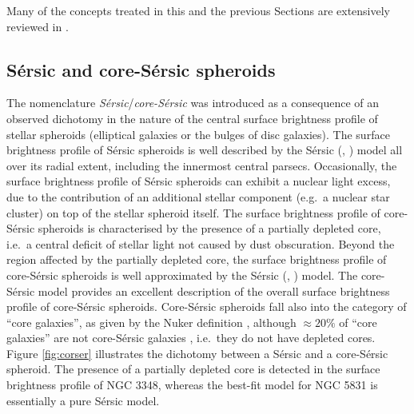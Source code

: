 Many of the concepts treated in this and the previous Sections 
are extensively reviewed in \cite{graham2016bulges}.

\subsection{S\'ersic and core-S\'ersic spheroids} 
\label{sec:corser}
The nomenclature \emph{S\'ersic}/\emph{core-S\'ersic} was introduced as a consequence of an observed dichotomy 
in the nature of the central surface brightness profile of stellar spheroids (elliptical galaxies or the bulges of disc galaxies). 
The surface brightness profile of S\'ersic spheroids is well described by the S\'ersic (\citeyear{sersic1963}, \citeyear{sersic1968}) model 
all over its radial extent, including the innermost central parsecs. 
Occasionally, the surface brightness profile of S\'ersic spheroids can exhibit a nuclear light excess, 
due to the contribution of an additional stellar component (e.g.~a nuclear star cluster) on top of the stellar spheroid itself. 
The surface brightness profile of core-S\'ersic spheroids is characterised by the presence of a partially depleted core, 
i.e.~a central deficit of stellar light not caused by dust obscuration. 
Beyond the region affected by the partially depleted core, 
the surface brightness profile of core-S\'ersic spheroids is well approximated by the S\'ersic (\citeyear{sersic1963}, \citeyear{sersic1968}) model. 
The core-S\'ersic model \citep{graham2003coresersicmodel,trujillo2004coresersicmodel} provides an excellent description 
of the overall surface brightness profile of core-S\'ersic spheroids. 
Core-S\'ersic spheroids fall also into the category of ``core galaxies'', as given by the Nuker definition \citep{lauer2007}, 
although $\approx 20\%$ of ``core galaxies'' are not core-S\'ersic galaxies \citep{dullograham2014cores}, 
i.e.~they do not have depleted cores.
Figure \ref{fig:corser} illustrates the dichotomy between a S\'ersic and a core-S\'ersic spheroid. 
The presence of a partially depleted core is detected in the surface brightness profile of NGC 3348, 
whereas the best-fit model for NGC 5831 is essentially a pure S\'ersic model. \\


